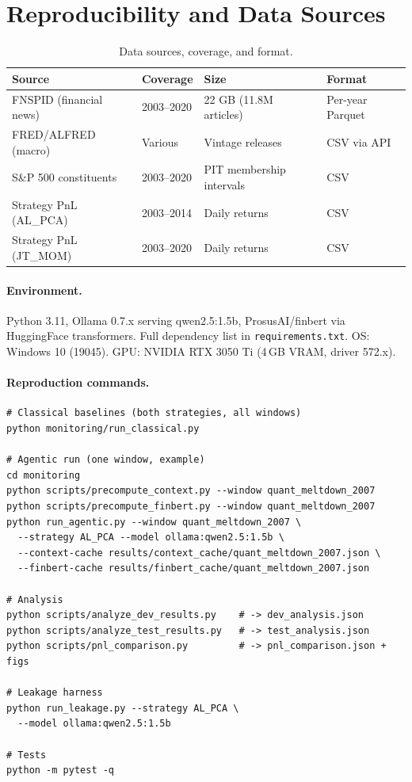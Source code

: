 \documentclass[11pt,a4paper]{article}
\begin{document}
\section{Reproducibility and Data Sources}\label{app:repro}

\begin{table}[htbp]
\centering
\footnotesize
\caption{Data sources, coverage, and format.}
\label{tab:sources}
\begin{tabular}{llll}
\toprule
Source & Coverage & Size & Format \\
\midrule
FNSPID (financial news)    & 2003--2020 & 22 GB (11.8M articles) & Per-year Parquet \\
FRED/ALFRED (macro)        & Various    & Vintage releases       & CSV via API \\
S\&P 500 constituents      & 2003--2020 & PIT membership intervals & CSV \\
Strategy PnL (AL\_PCA)     & 2003--2014 & Daily returns          & CSV \\
Strategy PnL (JT\_MOM)     & 2003--2020 & Daily returns          & CSV \\
\bottomrule
\end{tabular}
\end{table}

\paragraph{Environment.}
Python 3.11, Ollama 0.7.x serving qwen2.5:1.5b, ProsusAI/finbert via
HuggingFace transformers. Full dependency list in \texttt{requirements.txt}.
OS: Windows 10 (19045). GPU: NVIDIA RTX 3050 Ti (4\,GB VRAM, driver 572.x).

\paragraph{Reproduction commands.}
\begin{Verbatim}[fontsize=\small]
# Classical baselines (both strategies, all windows)
python monitoring/run_classical.py

# Agentic run (one window, example)
cd monitoring
python scripts/precompute_context.py --window quant_meltdown_2007
python scripts/precompute_finbert.py --window quant_meltdown_2007
python run_agentic.py --window quant_meltdown_2007 \
  --strategy AL_PCA --model ollama:qwen2.5:1.5b \
  --context-cache results/context_cache/quant_meltdown_2007.json \
  --finbert-cache results/finbert_cache/quant_meltdown_2007.json

# Analysis
python scripts/analyze_dev_results.py    # -> dev_analysis.json
python scripts/analyze_test_results.py   # -> test_analysis.json
python scripts/pnl_comparison.py         # -> pnl_comparison.json + figs

# Leakage harness
python run_leakage.py --strategy AL_PCA \
  --model ollama:qwen2.5:1.5b

# Tests
python -m pytest -q
\end{Verbatim}
\end{document}
